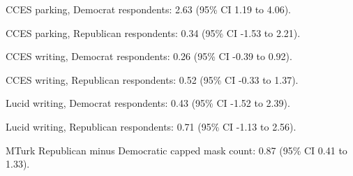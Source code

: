 CCES parking, Democrat respondents: 2.63 (95\% CI 1.19 to 4.06).

CCES parking, Republican respondents: 0.34 (95\% CI -1.53 to 2.21).

CCES writing, Democrat respondents: 0.26 (95\% CI -0.39 to 0.92).

CCES writing, Republican respondents: 0.52 (95\% CI -0.33 to 1.37).

Lucid writing, Democrat respondents: 0.43 (95\% CI -1.52 to 2.39).

Lucid writing, Republican respondents: 0.71 (95\% CI -1.13 to 2.56).

MTurk Republican minus Democratic capped mask count: 0.87 (95\% CI 0.41 to 1.33).
